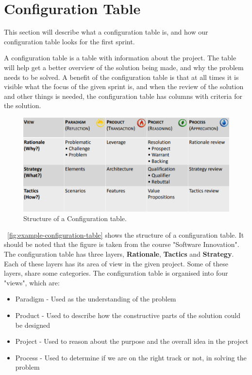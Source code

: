 \section{Configuration Table}\label{sec:first-configuration-table}
This section will describe what a configuration table is, and how our configuration table looks for the first sprint.

A configuration table is a table with information about the project. 
The table will help get a better overview of the solution being made, and why the problem needs to be solved.
A benefit of the configuration table is that at all times it is visible what the focus of the given sprint is, and when the review of the solution and other things is needed, the configuration table has columns with criteria for the solution.

\begin{figure}[h]
    \centering
    \includegraphics[width=\linewidth]{images/configurationTableExample.png}
    \caption{Structure of a Configuration table.}
    \label{fig:example-configuration-table}
\end{figure}

~\autoref{fig:example-configuration-table} shows the structure of a configuration table.
It should be noted that the figure is taken from the course "Software Innovation".
The configuration table has three layers, \textbf{Rationale}, \textbf{Tactics} and \textbf{Strategy}.
Each of these layers has its area of view in the given project.
Some of these layers, share some categories.
The configuration table is organised into four "views", which are:

\begin{itemize}
    \item Paradigm - Used as the understanding of the problem
    \item Product - Used to describe how the constructive parts of the solution could be designed
    \item Project - Used to reason about the purpose and the overall idea in the project
    \item Process - Used to determine if we are on the right track or not, in solving the problem
\end{itemize}


